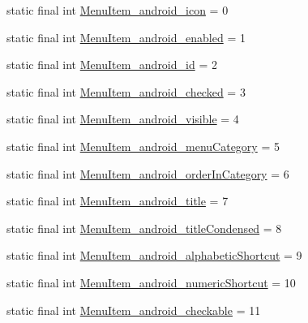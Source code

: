 \begin{DoxyCompactItemize}
\item 
static final int \mbox{\hyperlink{classandroid_1_1support_1_1v7_1_1appcompat_1_1_r_1_1styleable_a929c5f72b94b9937bcb487bfd6a5bd5a}{Menu\+Item\+\_\+android\+\_\+icon}} = 0
\item 
static final int \mbox{\hyperlink{classandroid_1_1support_1_1v7_1_1appcompat_1_1_r_1_1styleable_a22432eccfda7e6bea733708798b8b43f}{Menu\+Item\+\_\+android\+\_\+enabled}} = 1
\item 
static final int \mbox{\hyperlink{classandroid_1_1support_1_1v7_1_1appcompat_1_1_r_1_1styleable_abbb8e70843a1d51b8a7b1231fe92be5b}{Menu\+Item\+\_\+android\+\_\+id}} = 2
\item 
static final int \mbox{\hyperlink{classandroid_1_1support_1_1v7_1_1appcompat_1_1_r_1_1styleable_a1c1585a4f41fd9e947f5c4720a0b5ff3}{Menu\+Item\+\_\+android\+\_\+checked}} = 3
\item 
static final int \mbox{\hyperlink{classandroid_1_1support_1_1v7_1_1appcompat_1_1_r_1_1styleable_aec2b017060367d3fccc7b214fd12df1b}{Menu\+Item\+\_\+android\+\_\+visible}} = 4
\item 
static final int \mbox{\hyperlink{classandroid_1_1support_1_1v7_1_1appcompat_1_1_r_1_1styleable_a90dc3836b837bb1b393f5442c2992692}{Menu\+Item\+\_\+android\+\_\+menu\+Category}} = 5
\item 
static final int \mbox{\hyperlink{classandroid_1_1support_1_1v7_1_1appcompat_1_1_r_1_1styleable_aa1c0e909cd7ee99bf0a533a46cc1b7ea}{Menu\+Item\+\_\+android\+\_\+order\+In\+Category}} = 6
\item 
static final int \mbox{\hyperlink{classandroid_1_1support_1_1v7_1_1appcompat_1_1_r_1_1styleable_ae43bb3bba8a786dc2a2b824328c9d870}{Menu\+Item\+\_\+android\+\_\+title}} = 7
\item 
static final int \mbox{\hyperlink{classandroid_1_1support_1_1v7_1_1appcompat_1_1_r_1_1styleable_ada292a9182015c2384c05eec0475e10d}{Menu\+Item\+\_\+android\+\_\+title\+Condensed}} = 8
\item 
static final int \mbox{\hyperlink{classandroid_1_1support_1_1v7_1_1appcompat_1_1_r_1_1styleable_a03463ef53f9db3bc022e6ec1a2b4dadb}{Menu\+Item\+\_\+android\+\_\+alphabetic\+Shortcut}} = 9
\item 
static final int \mbox{\hyperlink{classandroid_1_1support_1_1v7_1_1appcompat_1_1_r_1_1styleable_a8bbbeb5f79fffd7b01e07b7c894d5566}{Menu\+Item\+\_\+android\+\_\+numeric\+Shortcut}} = 10
\item 
static final int \mbox{\hyperlink{classandroid_1_1support_1_1v7_1_1appcompat_1_1_r_1_1styleable_a466b1e8d87b74e69f6b01a98d43e9d19}{Menu\+Item\+\_\+android\+\_\+checkable}} = 11

\end{DoxyCompactItemize}
